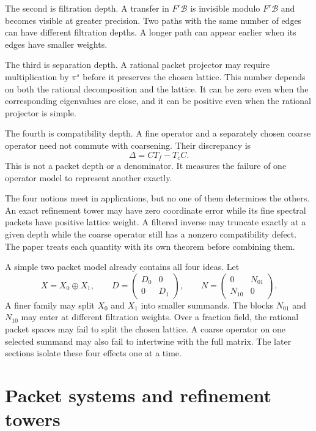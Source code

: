 \documentclass[11pt,a4paper]{article}
\theoremstyle{definition}
\theoremstyle{remark}
\newcommand{\Bcal}{\mathcal B}
\providecommand{\N}{\mathbb N}
\theoremstyle{definition}\newtheorem{construction}[theorem]{Construction}\newtheorem{certificate}[theorem]{Numerical Certificate}
\theoremstyle{remark}\newtheorem{boundary}[theorem]{Boundary}
\begin{document}
The second is filtration depth.  A transfer in $F^r\Bcal$ is invisible modulo $F^r\Bcal$ and becomes visible at greater precision.  Two paths with the same number of edges can have different filtration depths.  A longer path can appear earlier when its edges have smaller weights.

The third is separation depth.  A rational packet projector may require multiplication by $\pi^s$ before it preserves the chosen lattice.  This number depends on both the rational decomposition and the lattice.  It can be zero even when the corresponding eigenvalues are close, and it can be positive even when the rational projector is simple.

The fourth is compatibility depth.  A fine operator and a separately chosen coarse operator need not commute with coarsening.  Their discrepancy is
\[
\Delta=CT_f-T_cC.
\]
This is not a packet depth or a denominator.  It measures the failure of one operator model to represent another exactly.

The four notions meet in applications, but no one of them determines the others.  An exact refinement tower may have zero coordinate error while its fine spectral packets have positive lattice weight.  A filtered inverse may truncate exactly at a given depth while the coarse operator still has a nonzero compatibility defect.  The paper treats each quantity with its own theorem before combining them.

A simple two packet model already contains all four ideas.  Let
\[
X=X_0\oplus X_1,
\qquad
D=\begin{pmatrix}D_0&0\\0&D_1\end{pmatrix},
\qquad
N=\begin{pmatrix}0&N_{01}\\N_{10}&0\end{pmatrix}.
\]
A finer family may split $X_0$ and $X_1$ into smaller summands.  The blocks $N_{01}$ and $N_{10}$ may enter at different filtration weights.  Over a fraction field, the rational packet spaces may fail to split the chosen lattice.  A coarse operator on one selected summand may also fail to intertwine with the full matrix.  The later sections isolate these four effects one at a time.

\section{Packet systems and refinement towers}\label{sec:refinement}
\end{document}
